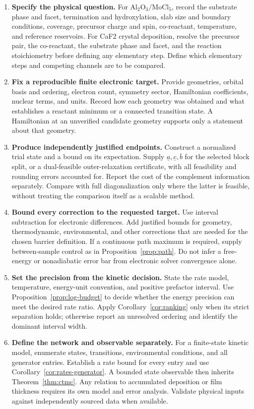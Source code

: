 \begin{enumerate}
\item \textbf{Specify the physical question.}
For $\mathrm{Al_2O_3}/\mathrm{MoCl_5}$, record the substrate phase and
facet, termination and hydroxylation, slab size and boundary conditions,
coverage, precursor charge and spin, co-reactant, temperature, and reference
reservoirs. For CaF2 crystal deposition, resolve the precursor pair, the
co-reactant, the substrate phase and facet, and the reaction stoichiometry
before defining any elementary step.
Define which elementary steps and competing channels are to be compared.

\item \textbf{Fix a reproducible finite electronic target.}
Provide geometries, orbital basis and ordering, electron count, symmetry
sector, Hamiltonian coefficients, nuclear terms, and units. Record how each
geometry was obtained and what establishes a reactant minimum or a connected
transition state. A Hamiltonian at an unverified candidate geometry supports
only a statement about that geometry.

\item \textbf{Produce independently justified endpoints.}
Construct a normalized trial state and a bound on its expectation. Supply
$\underline a,\underline c,\overline b$ for the selected block split,
or a dual-feasible outer-relaxation certificate, with all feasibility and
rounding errors accounted for. Report the cost of the complement information
separately. Compare with full diagonalization only where the latter is
feasible, without treating the comparison itself as a scalable method.

\item \textbf{Bound every correction to the requested target.}
Use interval subtraction for electronic differences. Add justified bounds
for geometry, thermodynamic, environmental, and other corrections that are
needed for the chosen barrier definition. If a continuous path maximum is
required, supply between-sample control as in Proposition~\ref{prop:path}.
Do not infer a free-energy or nonadiabatic error bar from electronic solver
convergence alone.

\item \textbf{Set the precision from the kinetic decision.}
State the rate model, temperature, energy-unit convention, and positive
prefactor interval. Use Proposition~\ref{prop:log-budget} to decide whether
the energy precision can meet the desired rate ratio. Apply
Corollary~\ref{cor:ranking} only when its strict separation holds; otherwise
report an unresolved ordering and identify the dominant interval width.

\item \textbf{Define the network and observable separately.}
For a finite-state kinetic model, enumerate states, transitions, environmental
conditions, and all generator entries. Establish a rate bound for every entry
and use Corollary~\ref{cor:rates-generator}. A bounded state observable then
inherits Theorem~\ref{thm:ctmc}. Any relation to accumulated deposition or
film thickness requires its own model and error analysis. Validate physical
inputs against independently sourced data when available.
\end{enumerate}

